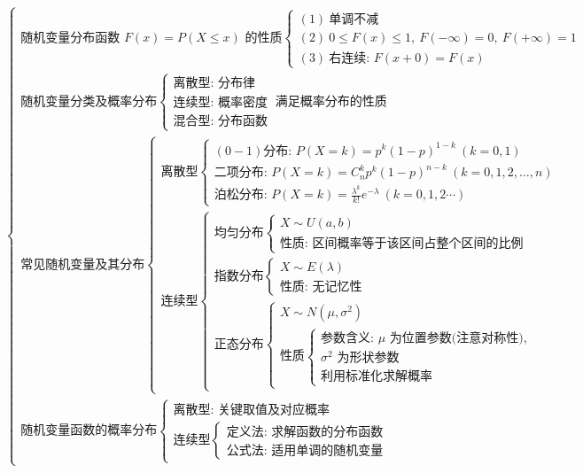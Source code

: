 \documentclass[lang=cn,11pt]{elegantbook}
\begin{document}
\[
\begin{cases}
\text{随机变量分布函数 } F(x) = P(X \le x) \text{ 的性质}
\begin{cases}
(1)\ \text{单调不减} \\
(2)\ 0 \le F(x) \le 1,\ F(-\infty)=0,\ F(+\infty)=1 \\
(3)\ \text{右连续: } F(x+0) = F(x)
\end{cases} \\[1em]
\text{随机变量分类及概率分布}
\begin{cases}
\text{离散型: 分布律} \\
\text{连续型: 概率密度} \\
\text{混合型: 分布函数}
\end{cases}
\ \text{满足概率分布的性质} \\[1em]
\text{常见随机变量及其分布}
\begin{cases}
\text{离散型}
\begin{cases}
(0-1)\text{分布: } P(X=k) = p^k(1-p)^{1-k}\ (k=0,1) \\
\text{二项分布: } P(X=k) = C_n^k p^k(1-p)^{n-k}\ (k=0,1,2,\dots,n) \\
\text{泊松分布: } P(X=k) = \frac{\lambda^k}{k!}e^{-\lambda}\ (k=0,1,2\cdots)
\end{cases} \\[2em]
\text{连续型}
\begin{cases}
\text{均匀分布}
\begin{cases}
X \sim U(a,b) \\
\text{性质: 区间概率等于该区间占整个区间的比例}
\end{cases} \\
\text{指数分布}
\begin{cases}
X \sim E(\lambda) \\
\text{性质: 无记忆性}
\end{cases} \\
\text{正态分布}
\begin{cases}
X \sim N(\mu,\sigma^2) \\
\text{性质}
\begin{cases}
\text{参数含义: } \mu \text{ 为位置参数(注意对称性),} \\
\sigma^2 \text{ 为形状参数} \\
\text{利用标准化求解概率}
\end{cases}
\end{cases}
\end{cases}
\end{cases} \\[1em]
\text{随机变量函数的概率分布}
\begin{cases}
\text{离散型: 关键取值及对应概率} \\
\text{连续型}
\begin{cases}
\text{定义法: 求解函数的分布函数} \\
\text{公式法: 适用单调的随机变量}
\end{cases}
\end{cases}
\end{cases}
\]
\end{document}
